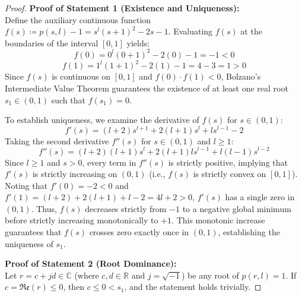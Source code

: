 \begin{proof}
\textbf{Proof of Statement 1 (Existence and Uniqueness):}\\
Define the auxiliary continuous function $f(s) \coloneqq p(s, l) - 1 = s^{l}(s+1)^2 - 2s - 1$. Evaluating $f(s)$ at the boundaries of the interval $[0,1]$ yields:
\begin{equation}
	f(0) = 0^{l}(0+1)^2 - 2(0) - 1 = -1 < 0
\end{equation}
\begin{equation}
	f(1) = 1^{l}(1+1)^2 - 2(1) - 1 = 4 - 3 = 1 > 0
\end{equation}
Since $f(s)$ is continuous on $[0,1]$ and $f(0) \cdot f(1) < 0$, Bolzano's Intermediate Value Theorem guarantees the existence of at least one real root $s_1 \in (0,1)$ such that $f(s_1) = 0$.

To establish uniqueness, we examine the derivative of $f(s)$ for $s \in (0,1)$:
\begin{equation}\label{eq:f_prime}
	f'(s) = (l+2)s^{l+1} + 2(l+1)s^{l} + l s^{l-1} - 2
\end{equation}
Taking the second derivative $f''(s)$ for $s \in (0,1)$ and $l \ge 1$:
\begin{equation}
	f''(s) = (l+2)(l+1)s^{l} + 2(l+1)l s^{l-1} + l(l-1)s^{l-2}
\end{equation}
Since $l \ge 1$ and $s > 0$, every term in $f''(s)$ is strictly positive, implying that $f'(s)$ is strictly increasing on $(0,1)$ (i.e., $f(s)$ is strictly convex on $[0,1]$). Noting that $f'(0) = -2 < 0$ and $f'(1) = (l+2) + 2(l+1) + l - 2 = 4l + 2 > 0$, $f'(s)$ has a single zero in $(0,1)$. Thus, $f(s)$ decreases strictly from $-1$ to a negative global minimum before strictly increasing monotonically to $+1$. This monotonic increase guarantees that $f(s)$ crosses zero exactly once in $(0,1)$, establishing the uniqueness of $s_1$.

\vspace{0.5em}
\textbf{Proof of Statement 2 (Root Dominance):}\\
Let $r = c + j d \in \mathbb{C}$ (where $c, d \in \mathbb{R}$ and $j = \sqrt{-1}$) be any root of $p(r, l) = 1$. If $c = \mathfrak{Re}(r) \le 0$, then $c \le 0 < s_1$, and the statement holds trivially. 


\end{proof}
